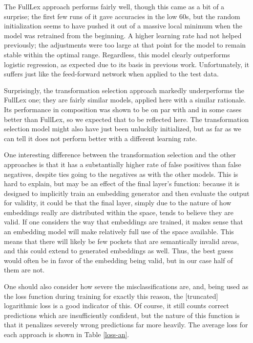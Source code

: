 \documentclass[a4paper, 12pt]{article}
\begin{document}
The FullLex approach performs fairly well, though this came as a bit of a surprise; the first few runs of it gave accuracies in the low 60s, but the random initialization seems to have pushed it out of a massive local minimum when the model was retrained from the beginning. A higher learning rate had not helped previously; the adjustments were too large at that point for the model to remain stable within the optimal range. Regardless, this model clearly outperforms logistic regression, as expected due to its basis in previous work. Unfortunately, it suffers just like the feed-forward network when applied to the test data.

Surprisingly, the transformation selection approach markedly underperforms the FullLex one; they are fairly similar models, applied here with a similar rationale. Its performance in composition was shown to be on par with and in some cases better than FullLex, so we expected that to be reflected here. The transformation selection model might also have just been unluckily initialized, but as far as we can tell it does not perform better with a different learning rate.

One interesting difference between the transformation selection and the other approaches is that it has a substantially higher rate of false positives than false negatives, despite ties going to the negatives as with the other models. This is hard to explain, but may be an effect of the final layer's function: because it is designed to implicitly train an embedding generator and then evaluate the output for validity, it could be that the final layer, simply due to the nature of how embeddings really are distributed within the space, tends to believe they are valid. If one considers the way that embeddings are trained, it makes sense that an embedding model will make relatively full use of the space available. This means that there will likely be few pockets that are semantically invalid areas, and this could extend to generated embeddings as well. Thus, the best guess would often be in favor of the embedding being valid, but in our case half of them are not.

One should also consider how severe the misclassifications are, and, being used as the loss function during training for exactly this reason, the [truncated] logarithmic loss is a good indicator of this. Of course, it still counts correct predictions which are insufficiently confident, but the nature of this function is that it penalizes severely wrong predictions far more heavily. The average loss for each approach is shown in Table \ref{loss-an}.
\end{document}
